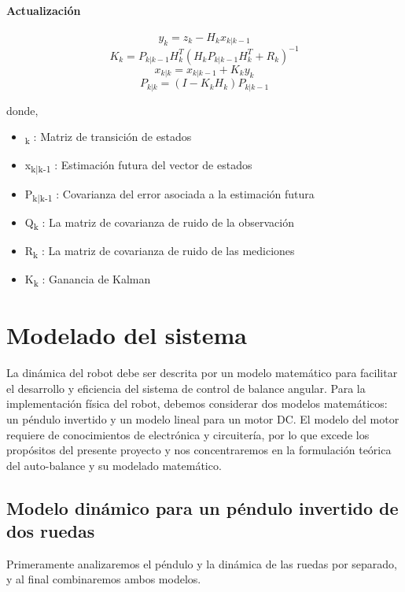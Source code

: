 \documentclass[10pt]{article}
\begin{document}
\paragraph{Actualización}
\begin{center}
\begin{equation}
y_k = z_k - H_k x_{k|k-1}
\end{equation}
\begin{equation}
K_k = P_{k|k-1} H_k ^ T (H_k P_{k|k-1} H_k ^ T + R_k)^{-1}
\end{equation}
\begin{equation}
x_{k|k} = x_{k|k-1} + K_k y_k
\end{equation}
\begin{equation}
P_{k|k} = (I - K_k H_k)P_{k|k-1}
\end{equation}
\end{center}
donde,
\begin{itemize}
\item \textPhi\textsubscript{k} : Matriz de transición de estados
\item x\textsubscript{k|k-1} : Estimación futura del vector de estados
\item P\textsubscript{k|k-1} : Covarianza del error asociada a la estimación futura
\item Q\textsubscript{k} : La matriz de covarianza de ruido de la observación
\item R\textsubscript{k} : La matriz de covarianza de ruido de las mediciones
\item K\textsubscript{k} : Ganancia de Kalman
\end{itemize}
\section{Modelado del sistema}
La dinámica del robot debe ser descrita por un modelo matemático para facilitar el desarrollo y eficiencia del sistema de control  de balance angular. Para la implementación física del robot, debemos considerar dos modelos matemáticos: un péndulo invertido y un modelo lineal para un motor DC. El modelo del motor requiere de conocimientos de electrónica y circuitería, por lo que excede los propósitos del presente proyecto y nos concentraremos en la formulación teórica del auto-balance y su modelado matemático.
\subsection{Modelo dinámico para un péndulo invertido de dos ruedas}
Primeramente analizaremos el péndulo y la dinámica de las ruedas por separado, y al final combinaremos ambos modelos.
\end{document}
